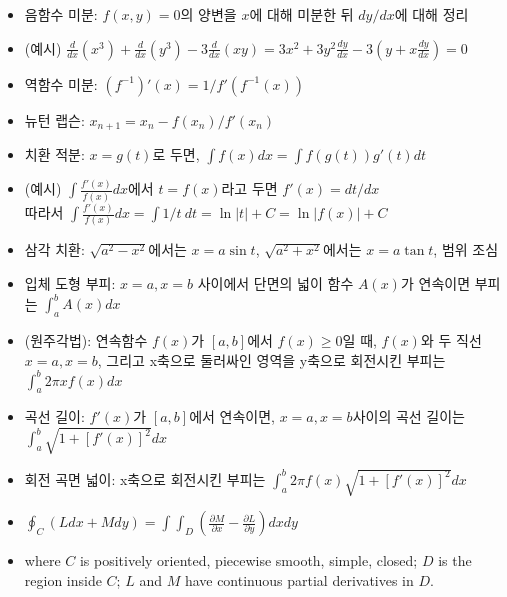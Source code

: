 \begin{itemize}[noitemsep]
    \item 음함수 미분: $f(x,y)=0$의 양변을 $x$에 대해 미분한 뒤 $dy/dx$에 대해 정리
    \item (예시) $\frac{d}{dx}(x^3)+\frac{d}{dx}(y^3) - 3\frac{d}{dx}(xy) = 3x^2+3y^2\frac{dy}{dx}-3(y+x\frac{dy}{dx}) = 0$
    \item 역함수 미분: $(f^{-1})\prime(x)=1/f\prime(f^{-1}(x))$
    \item 뉴턴 랩슨: $x_{n+1}=x_{n}-f(x_n)/f'(x_n)$
    \item 치환 적분: $x=g(t)$로 두면, $\int f(x)dx=\int f(g(t))g\prime(t) dt$
    \item (예시) $\int \frac{f\prime(x)}{f(x)}dx$에서 $t=f(x)$라고 두면 $f\prime(x)=dt/dx$\\
    따라서 $\int \frac{f\prime(x)}{f(x)}dx = \int 1/t\ dt = \ln \vert t\vert + C=\ln\vert f(x)\vert + C$
    \item 삼각 치환: $\sqrt{a^2-x^2}$에서는 $x=a\sin t$, $\sqrt{a^2+x^2}$에서는 $x=a\tan t$, 범위 조심
    \item 입체 도형 부피: $x=a, x=b$ 사이에서 단면의 넓이 함수 $A(x)$가 연속이면 부피는 $\int_a^b A(x)dx$
    \item (원주각법): 연속함수 $f(x)$가 $[a,b]$에서 $f(x)\ge 0$일 때, $f(x)$와 두 직선 $x=a,x=b$, 그리고 x축으로 둘러싸인 영역을 y축으로 회전시킨 부피는 $\int_a^b 2\pi xf(x)dx$
    \item 곡선 길이: $f\prime(x)$가 $[a,b]$에서 연속이면, $x=a,x=b$사이의 곡선 길이는 $\int_a^b\sqrt{1+[f\prime(x)]^2}dx$
    \item 회전 곡면 넓이: x축으로 회전시킨 부피는 $\int_a^b 2\pi f(x)\sqrt{1+[f\prime(x)]^2}dx$
    \item $\oint_C (Ldx+Mdy)=\int\int_D (\frac{\partial M}{\partial x}-\frac{\partial L}{\partial y})dxdy$
    \item where $C$ is positively oriented, piecewise smooth, simple, closed; $D$ is the region inside $C$; $L$ and $M$ have continuous partial derivatives in $D$.
\end{itemize}
